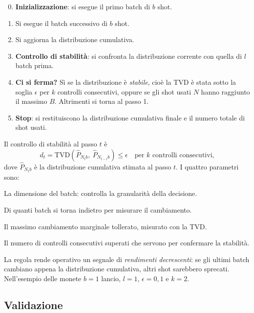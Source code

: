 \begin{algoritmo}[StableShots]
\begin{enumerate}
  \setcounter{enumi}{-1}
  \item \textbf{Inizializzazione}: si esegue il primo batch di $b$ shot.
  \item Si esegue il batch successivo di $b$ shot.
  \item Si aggiorna la distribuzione cumulativa.
  \item \textbf{Controllo di stabilità}: si confronta la distribuzione corrente con quella di $l$ batch prima.
  \item \textbf{Ci si ferma?} Sì se la distribuzione è \emph{stabile}, cioè la TVD è stata sotto la soglia $\epsilon$
    per $k$ controlli consecutivi, oppure se gli shot usati $N$ hanno raggiunto il massimo $B$. Altrimenti si torna al
    passo 1.
  \item \textbf{Stop}: si restituiscono la distribuzione cumulativa finale e il numero totale di shot usati.
\end{enumerate}
\end{algoritmo}

Il controllo di stabilità al passo $t$ è
\begin{equation}
\label{eq:qse-stabile}
d_t = \mathrm{TVD}\!\left(\hat{P}_{N_t b},\ \hat{P}_{N_{t-l} b}\right) \le \epsilon
\quad \text{per } k \text{ controlli consecutivi,}
\end{equation}
dove $\hat{P}_{N_t b}$ è la distribuzione cumulativa stimata al passo $t$. I quattro parametri sono:
\begin{description}[leftmargin=0pt, style=unboxed]
  \item[$b$ (batch size).] La dimensione del batch: controlla la granularità della decisione.
  \item[$l$ (look-back window).] Di quanti batch si torna indietro per misurare il cambiamento.
  \item[$\epsilon$ (threshold).] Il massimo cambiamento marginale tollerato, misurato con la TVD.
  \item[$k$ (patience).] Il numero di controlli consecutivi superati che servono per confermare la stabilità.
\end{description}
La regola rende operativo un segnale di \emph{rendimenti decrescenti}: se gli ultimi batch cambiano appena la
distribuzione cumulativa, altri shot sarebbero sprecati. Nell'esempio delle monete $b = 1$ lancio, $l = 1$,
$\epsilon = 0{,}1$ e $k = 2$.

\subsection{Validazione}


